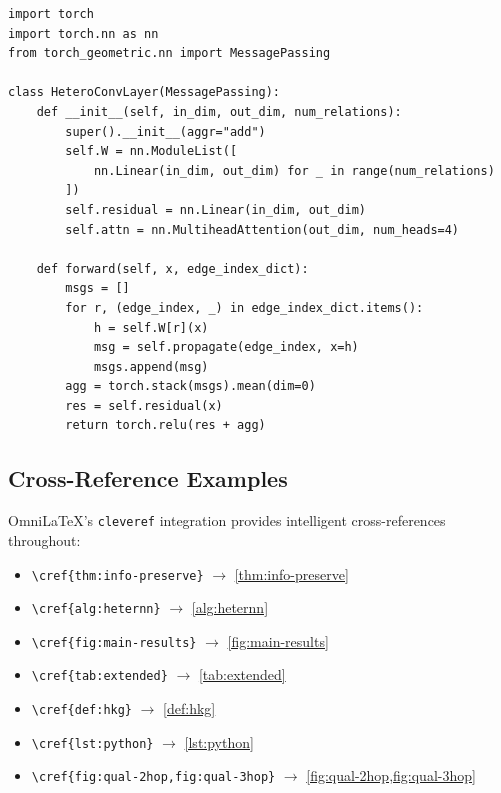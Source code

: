 \documentclass[
    language=english,
    doctype=article,
    institution=none,
]{../../omnilatex}
\theoremstyle{definition}
\theoremstyle{definition}
\theoremstyle{remark}
\begin{document}
\begin{listing}[htbp]
    \centering
    \begin{verbatim}
import torch
import torch.nn as nn
from torch_geometric.nn import MessagePassing

class HeteroConvLayer(MessagePassing):
    def __init__(self, in_dim, out_dim, num_relations):
        super().__init__(aggr="add")
        self.W = nn.ModuleList([
            nn.Linear(in_dim, out_dim) for _ in range(num_relations)
        ])
        self.residual = nn.Linear(in_dim, out_dim)
        self.attn = nn.MultiheadAttention(out_dim, num_heads=4)

    def forward(self, x, edge_index_dict):
        msgs = []
        for r, (edge_index, _) in edge_index_dict.items():
            h = self.W[r](x)
            msg = self.propagate(edge_index, x=h)
            msgs.append(msg)
        agg = torch.stack(msgs).mean(dim=0)
        res = self.residual(x)
        return torch.relu(res + agg)
    \end{verbatim}
    \caption{Core HeteroGNN layer in PyTorch Geometric.}
    \label{lst:python}
\end{listing}

\subsection{Cross-Reference Examples}

OmniLaTeX's \texttt{cleveref} integration provides intelligent
cross-references throughout:

\begin{itemize}
    \item \verb|\cref{thm:info-preserve}| \(\to\) \cref{thm:info-preserve}
    \item \verb|\cref{alg:heternn}| \(\to\) \cref{alg:heternn}
    \item \verb|\cref{fig:main-results}| \(\to\) \cref{fig:main-results}
    \item \verb|\cref{tab:extended}| \(\to\) \cref{tab:extended}
    \item \verb|\cref{def:hkg}| \(\to\) \cref{def:hkg}
    \item \verb|\cref{lst:python}| \(\to\) \cref{lst:python}
    \item \verb|\cref{fig:qual-2hop,fig:qual-3hop}|
          \(\to\) \cref{fig:qual-2hop,fig:qual-3hop}
\end{itemize}

\printbibliography
\end{document}
